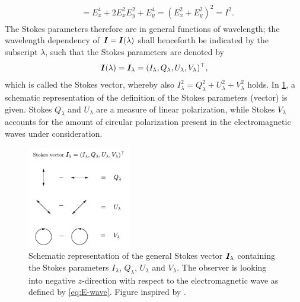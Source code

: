 \documentclass[a4paper,11pt]{report}
\def\fc#1{{\color{black}{#1}}} %
\begin{document}
\begin{align}
\begin{aligned}
&= E_x^4 + 2E_x^2E_y^2 + E_y^4 = (E_x^2+E_y^2)^2 = I^2.
\end{aligned}
\end{align} \fc{Note however, that this relation only holds for completely monochromatic light, as it was derived under this assumption.} The Stokes parameters therefore are in general functions of wavelength; the wavelength dependency of $\bm{I} = \bm{I}(\lambda)$ shall henceforth be indicated by the subscript $\lambda$, such that the Stokes parameters are denoted by \begin{equation}
\bm{I}(\lambda) = \bm{I}_\lambda = (I_\lambda, Q_\lambda, U_\lambda, V_\lambda)^\top,
\end{equation} which is called the Stokes vector, whereby also $I_\lambda^2 = Q_\lambda^2 + U_\lambda^2 + V_\lambda^2$ holds. In \cref{fig:stokesvector}, a schematic representation of the definition of the Stokes parameters (vector) is given. Stokes $Q_\lambda$ and $U_\lambda$ are a measure of linear polarization, while Stokes $V_\lambda$ accounts for the amount of circular polarization present in the electromagnetic waves under consideration.
\begin{figure}[h]
\centering
\includegraphics[width=4.5cm]{figures/stokesvector.pdf}
\caption{Schematic representation of the general Stokes vector $\bm{I}_\lambda$ containing the Stokes parameters $I_\lambda$, $Q_\lambda$, $U_\lambda$ and $V_\lambda$. The observer is looking into negative $z$-direction with respect to the electromagnetic wave as defined by \cref{eq:E-wave}. Figure inspired by \cite[p.17]{DeglInnocenti.2005}.}
\label{fig:stokesvector}
\end{figure}
\end{document}
